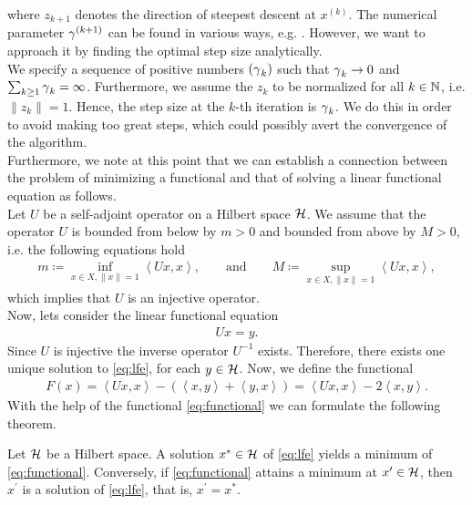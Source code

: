 where $z_{k+1}$ denotes the direction of steepest descent at $x^{(k)}$. The numerical parameter $\operatorname{\gamma}^{(k+1)}$ can be found in various ways, e.g. \cite[Chapter~XV]{kantorovich2016functional}. However, we want to approach it by finding the optimal step size analytically.\\
We specify a sequence of positive numbers $(\operatorname{\gamma}_k)$ such that $\operatorname{\gamma}_k \to 0$ and $\sum_{k\geq 1} \operatorname{\gamma}_k = \infty$. Furthermore, we assume the $z_k$ to be normalized for all $k\in \operatorname{\mathbb{N}}$, i.e. $\|z_k\| = 1$. Hence, the step size at the $k$-th iteration is $\operatorname{\gamma}_k$. We do this in order to avoid making too great steps, which could possibly avert the convergence of the algorithm.\\
Furthermore, we note at this point that we can establish a connection between the problem of minimizing a functional and that of solving a linear functional equation as follows.\\
Let $U$ be a self-adjoint operator on a Hilbert space $\mathcal{H}$. We assume that the operator $U$ is bounded from below by $m>0$ and bounded from above by $M>0$, i.e. the following equations hold
\begin{align*}
m \coloneqq \inf_{x\in X, \|x\| = 1} \left\langle Ux, x \right\rangle, \qquad \text{and} \qquad M \coloneqq \sup_{x\in X, \|x\| = 1} \left\langle Ux, x \right\rangle,
\end{align*}
which implies that $U$ is an injective operator.\\
Now, lets consider the linear functional equation
\begin{align}\label{eq:lfe}
Ux = y.
\end{align}
Since $U$ is injective the inverse operator $U^{-1}$ exists. Therefore, there exists one unique solution to \eqref{eq:lfe}, for each $y\in\mathcal{H}$. Now, we define the functional
\begin{align}\label{eq:functional}
F(x) = \left\langle Ux, x\right\rangle - \left( \left\langle x, y\right\rangle + \left\langle y, x\right\rangle \right) = \left\langle Ux, x\right\rangle - 2 \left\langle x, y\right\rangle.
\end{align}
With the help of the functional \eqref{eq:functional} we can formulate the following theorem.

\begin{theorem}\label{theorem:min_lfe}
Let $\mathcal{H}$ be a Hilbert space. A solution $x^{\ast}\in \mathcal{H}$ of \eqref{eq:lfe} yields a minimum of \eqref{eq:functional}. Conversely, if \eqref{eq:functional} attains a minimum at $x^{\prime} \in \mathcal{H}$, then $x^{\prime}$ is a solution of \eqref{eq:lfe}, that is, $x^{\prime} = x^{\ast}$.
\end{theorem}

